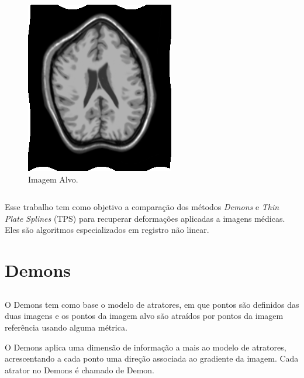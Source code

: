 \documentclass[t]{beamer}
\begin{document}
\begin{frame}
\begin{columns}[c]
\begin{figure}[!h]
\begin{center}
            \includegraphics[width=1.0\textwidth]{../images/movingImageSin.png}
            \caption{Imagem Alvo.}
          \end{center}
        \end{figure}
    \end{columns}
\end{frame}

\begin{frame}
Esse trabalho tem como objetivo a comparação dos métodos \textit{Demons}\cite{thirion1995fast} e 
\textit{Thin Plate Splines}\cite{goshtasby1988registration} (TPS) para recuperar deformações aplicadas a imagens médicas.
Eles são algoritmos especializados em registro não linear.
\end{frame}

\section{Demons}
\subsection{}
\begin{frame}
O Demons tem como base o modelo de atratores, em que pontos são
definidos das duas imagens e os pontos da imagem alvo são atraídos por pontos da imagem referência usando alguma 
métrica.

O Demons aplica uma dimensão de informação a mais ao modelo de atratores, acrescentando a cada ponto uma direção
associada ao gradiente da imagem. Cada atrator no Demons é chamado de Demon.
\end{frame}
\end{document}
